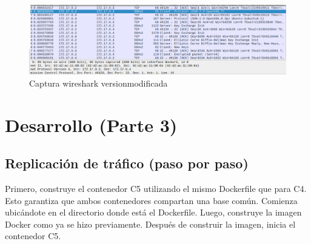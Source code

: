 \documentclass[letter,12pt]{article}
\begin{document}
\begin{figure}[H]
        \centering
        \includegraphics[width=1\textwidth]{img/docker__c4_mode.png}  
        \caption{Captura wireshark versionmodificada}
    \end{figure}
\section{Desarrollo (Parte 3)}

\subsection{Replicación de tráfico (paso por paso)}
Primero, construye el contenedor C5 utilizando el mismo Dockerfile que para C4. Esto garantiza que ambos contenedores compartan una base común. Comienza ubicándote en el directorio donde está el Dockerfile. Luego, construye la imagen Docker como ya se hizo previamente. Después de construir la imagen, inicia el contenedor C5.\\
\end{document}
